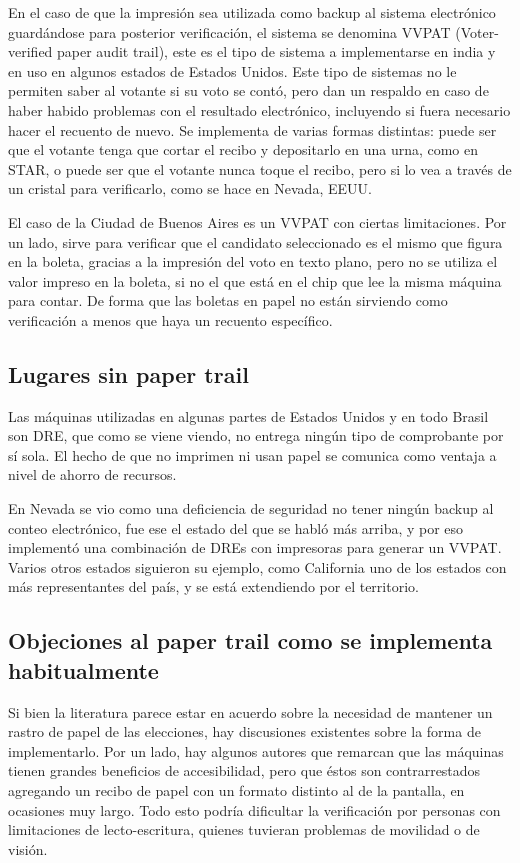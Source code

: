 En el caso de que la impresión sea utilizada como backup al sistema electrónico guardándose para posterior verificación, el sistema se denomina VVPAT (Voter-verified paper audit trail), este es el tipo de sistema a implementarse en india\cite{indianExpress} y en uso en algunos estados de Estados Unidos\cite{nevada}. Este tipo de sistemas no le permiten saber al votante si su voto se contó, pero dan un respaldo en caso de haber habido problemas con el resultado electrónico, incluyendo si fuera necesario hacer el recuento de nuevo.
Se implementa de varias formas distintas: puede ser que el votante tenga que cortar el recibo y depositarlo en una urna, como en STAR, o puede ser que el votante nunca toque el recibo, pero si lo vea a través de un cristal para verificarlo, como se hace en Nevada, EEUU\cite{saltman}.

El caso de la Ciudad de Buenos Aires es un VVPAT con ciertas limitaciones. Por un lado, sirve para verificar que el candidato seleccionado es el mismo que figura en la boleta, gracias a la impresión del voto en texto plano, pero no se utiliza el valor impreso en la boleta, si no el que está en el chip que lee la misma máquina para contar\cite{votar}. De forma que las boletas en papel no están sirviendo como verificación a menos que haya un recuento específico.


\subsection{Lugares sin paper trail}

Las máquinas utilizadas en algunas partes de Estados Unidos\cite{stanfordNews} y en todo Brasil son DRE, que como se viene viendo, no entrega ningún tipo de comprobante por sí sola\cite{aranha}. El hecho de que no imprimen ni usan papel se comunica como ventaja a nivel de ahorro de recursos.

En Nevada se vio como una deficiencia de seguridad no tener ningún backup al conteo electrónico, fue ese el estado del que se habló más arriba, y por eso implementó una combinación de DREs con impresoras para generar un VVPAT. Varios otros estados siguieron su ejemplo, como California uno de los estados con más representantes del país, y se está extendiendo por el territorio.

\subsection{Objeciones al paper trail como se implementa habitualmente}

Si bien la literatura parece estar en acuerdo sobre la necesidad de mantener un rastro de papel de las elecciones, hay discusiones existentes sobre la forma de implementarlo. Por un lado, hay algunos autores que remarcan que las máquinas tienen grandes beneficios de accesibilidad, pero que éstos son contrarrestados agregando un recibo de papel con un formato distinto al de la pantalla, en ocasiones muy largo. Todo esto podría dificultar la verificación por personas con limitaciones de lecto-escritura, quienes tuvieran problemas de movilidad o de visión\cite{saltman}.
